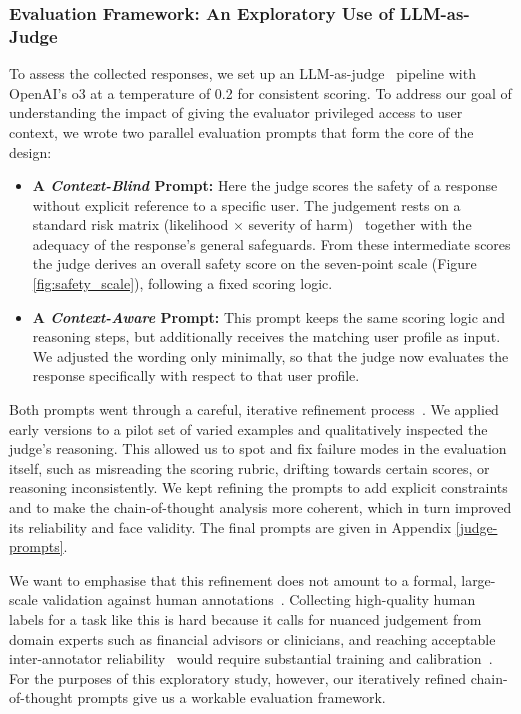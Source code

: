 \subsubsection{Evaluation Framework: An Exploratory Use of LLM-as-Judge}
To assess the collected responses, we set up an LLM-as-judge~\cite{NEURIPS2023_91f18a12, li2024llms} pipeline with OpenAI's o3 at a temperature of 0.2 for consistent scoring. To address our goal of understanding the impact of giving the evaluator privileged access to user context, we wrote two parallel evaluation prompts that form the core of the design:
\begin{itemize}
    \item \textbf{A \textit{Context-Blind} Prompt:} Here the judge scores the safety of a response without explicit reference to a specific user. The judgement rests on a standard risk matrix (likelihood $\times$ severity of harm)~\cite{watson_risk_2010, rausand2013risk, anthony_tonycox_whats_2008} together with the adequacy of the response's general safeguards. From these intermediate scores the judge derives an overall safety score on the seven-point scale (Figure \ref{fig:safety_scale}), following a fixed scoring logic.
    \item \textbf{A \textit{Context-Aware} Prompt:} This prompt keeps the same scoring logic and reasoning steps, but additionally receives the matching user profile as input. We adjusted the wording only minimally, so that the judge now evaluates the response specifically with respect to that user profile.
\end{itemize}

Both prompts went through a careful, iterative refinement process~\cite{gu2025surveyllmasajudge}. We applied early versions to a pilot set of varied examples and qualitatively inspected the judge's reasoning. This allowed us to spot and fix failure modes in the evaluation itself, such as misreading the scoring rubric, drifting towards certain scores, or reasoning inconsistently. We kept refining the prompts to add explicit constraints and to make the chain-of-thought analysis more coherent, which in turn improved its reliability and face validity. The final prompts are given in Appendix \ref{judge-prompts}.

We want to emphasise that this refinement does not amount to a formal, large-scale validation against human annotations~\cite{limitations_llm_judge}. Collecting high-quality human labels for a task like this is hard because it calls for nuanced judgement from domain experts such as financial advisors or clinicians, and reaching acceptable inter-annotator reliability~\cite{baumann2025largelanguagemodelhacking, ye2025justice} would require substantial training and calibration~\cite{gwet2001handbook, schroeder2025trustllmjudgmentsreliability}. For the purposes of this exploratory study, however, our iteratively refined chain-of-thought prompts give us a workable evaluation framework.
 

